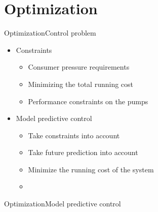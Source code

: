 \section{Optimization}



\begin{frame}{Optimization}{Control problem}
\begin{itemize}
	\item<1-> Constraints  
	\begin{itemize}
	\item<1-> Consumer pressure requirements
	\item<1-> Minimizing the total running cost 
	\item<1-> Performance constraints on the pumps
	\end{itemize}
\end{itemize}

\begin{itemize}
	\item<2-> Model predictive control 
	\begin{itemize}
	\item<2-> Take constraints into account	
	\item<2-> Take future prediction into account 
	\item<2-> Minimize the running cost of the system
	\item<3->[] \vspace{0.5cm}

	\begin{figure}[H]
	\centering
	 
	\end{figure}
	\end{itemize}
\end{itemize}


%  

\end{frame}




\begin{frame}{Optimization}{Model predictive control}

\begin{figure}[H]
\centering
 
\end{figure}


\end{frame}

